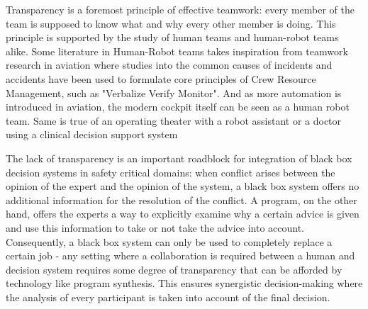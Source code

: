 Transparency is a foremost principle of effective teamwork: every member of the team is supposed to know what and why every other member is doing. 
This principle is supported by the study of human teams \cite{bagPEERTRANSPARENCYTEAMS2012a, solomonInferenceTransparencyEffective2021} and human-robot teams \cite{ezenyilimbaImpactTransparencyExplanations2022, guznovRobotTransparencyTeam2019, holderDesigningBiDirectionalTransparency2021, lakhmaniExploringEffectCommunication2019, lakhmaniProposedApproachDetermining2016, mercadoIntelligentAgentTransparency2016, ososkyDeterminantsSystemTransparency2014, panganibanTransparencyAutonomousTeammates2020, ronconeTransparentRoleAssignment2017} alike.
Some literature in Human-Robot teams takes inspiration \cite{shivelyCrewResourceManagement2018} from teamwork research in aviation where studies into the common causes of incidents and accidents \cite{chidesterPersonalityFactorsFlight1990, chidesterPilotPersonalityCrew1991, smithSimulatorStudyInteraction1979} have been used to formulate core principles of Crew Resource Management, such as "Verbalize Verify Monitor".
And as more automation is introduced in aviation, the modern cockpit itself can be seen as a human robot team.
Same is true of an operating theater with a robot assistant \cite{weerarathnaHumanRobotCollaborationHealthcare2023} or a doctor using a clinical decision support system \cite{castilloConsiderationsSuccessfulClinical2013, mooreIntroductionClinicalDecision2011, osullivanDecisionTimeClinical2014, purcellWhatMakesGood2005, sakallarisClinicalDecisionSupport2000, selfClinicalDecisionSupport2008, stangeThisIssueClinical2011, wrightClinicalDecisionSupport2009}

The lack of transparency is an important roadblock for integration of black box decision systems in safety critical domains: when conflict arises between the opinion of the expert and the opinion of the system, a black box system offers no additional information for the resolution of the conflict. 
A program, on the other hand, offers the experts a way to explicitly examine why a certain advice is given and use this information to take or not take the advice into account. 
Consequently, a black box system can only be used to completely replace a certain job - any setting where a collaboration is required between a human and decision system requires some degree of transparency that can be afforded by technology like program synthesis. 
This ensures synergistic decision-making where the analysis of every participant is taken into account of the final decision.

